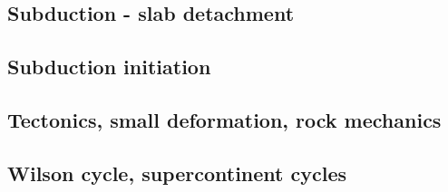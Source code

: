 \subsection*{Subduction - slab detachment}

\cite{wosp92}
\cite{yowo95}
\cite{wowo97}
\cite{desw98}
\cite{wosp00}
\cite{anbi09}
\cite{dugm11}
\cite{dugk12}
\cite{dusg12}
\cite{dugs14}

\subsection*{Subduction initiation}

\cite{togu98}
\cite{dohe01}\cite{reyb01}
\cite{hags03}
\cite{nigm10}
\cite{dyge13}


\subsection*{Tectonics, small deformation, rock mechanics}

\cite{ilma93}
\cite{hept96}
\cite{lega12}

\subsection*{Wilson cycle, supercontinent cycles}

\cite{trry95}
\cite{zhzl07}
\cite{zhzm09}





